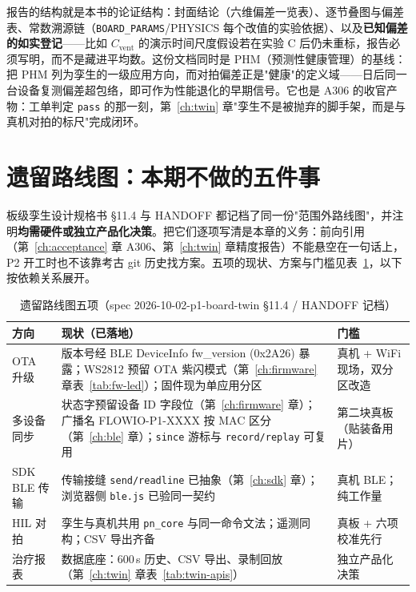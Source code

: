 报告的结构就是本书的论证结构：封面结论（六维偏差一览表）、逐节叠图与偏差表、常数溯源链（\texttt{BOARD\_PARAMS}/PHYSICS 每个改值的实验依据）、以及\textbf{已知偏差的如实登记}——比如 $C_\text{vent}$ 的演示时间尺度假设若在实验 C 后仍未重标，报告必须写明，而不是藏进平均数。这份文档同时是 PHM（预测性健康管理）的基线：\cite{Tao2019} 把 PHM 列为孪生的一级应用方向，而对拍偏差正是"健康"的定义域——日后同一台设备复测偏差超包络，即可作为性能退化的早期信号。它也是 A306 的收官产物：工单判定 \texttt{pass} 的那一刻，第~\ref{ch:twin} 章"孪生不是被抛弃的脚手架，而是与真机对拍的标尺"完成闭环。

\section{遗留路线图：本期不做的五件事}
\label{sec:product-roadmap}

板级孪生设计规格书 \S11.4 与 HANDOFF 都记档了同一份"范围外路线图"，并注明\textbf{均需硬件或独立产品化决策}。把它们逐项写清是本章的义务：前向引用（第~\ref{ch:acceptance} 章 A306、第~\ref{ch:twin} 章精度报告）不能悬空在一句话上，P2 开工时也不该靠考古 git 历史找方案。五项的现状、方案与门槛见表~\ref{tab:product-roadmap}，以下按依赖关系展开。

\begin{table}[htbp]
  \centering
  \caption{遗留路线图五项（spec 2026-10-02-p1-board-twin \S11.4 / HANDOFF 记档）}
  \label{tab:product-roadmap}
  \begin{tabular}{lp{5.4cm}p{4.6cm}}
    \toprule
    方向 & 现状（已落地） & 门槛 \\
    \midrule
    OTA 升级 & 版本号经 BLE DeviceInfo fw\_version (0x2A26) 暴露；WS2812 预留 OTA 紫闪模式（第~\ref{ch:firmware} 章表~\ref{tab:fw-led}）；固件现为单应用分区 & 真机 + WiFi 现场，双分区改造 \\
    多设备同步 & 状态字预留设备 ID 字段位（第~\ref{ch:firmware} 章）；广播名 FLOWIO-P1-XXXX 按 MAC 区分（第~\ref{ch:ble} 章）；\texttt{since} 游标与 \texttt{record/replay} 可复用 & 第二块真板（贴装备用片） \\
    SDK BLE 传输 & 传输接缝 \texttt{send/readline} 已抽象（第~\ref{ch:sdk} 章）；浏览器侧 \texttt{ble.js} 已验同一契约 & 真机 BLE；纯工作量 \\
    HIL 对拍 & 孪生与真机共用 \texttt{pn\_core} 与同一命令文法；遥测同构；CSV 导出齐备 & 真板 + 六项校准先行 \\
    治疗报表 & 数据底座：600\,s 历史、CSV 导出、录制回放（第~\ref{ch:twin} 章表~\ref{tab:twin-apis}） & 独立产品化决策 \\
    \bottomrule
  \end{tabular}
\end{table}

